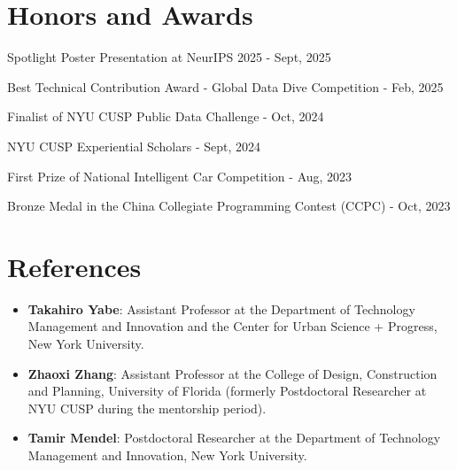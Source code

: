 \documentclass[a4paper,20pt]{article}
\newcommand{\github}[1]{
  \href{#1}{\faGithub}
}
\newcommand{\paper}[1]{
  \href{#1}{\faLink}
}
\newcommand{\resumeItem}[2]{
  \item\small{
    \textbf{#1}{: #2 \vspace{-2pt}}
  }
}
\newcommand{\resumeSubItem}[2]{\resumeItem{#1}{#2}\vspace{-3pt}}
\newcommand{\resumeSubHeadingListStart}{\begin{itemize}[leftmargin=0pt, label={}]}
\newcommand{\resumeSubHeadingListEnd}{\end{itemize}}
\begin{document}
\section{Honors and Awards}
\begin{description}[font=$\bullet$]
  \item{Spotlight Poster Presentation at NeurIPS 2025 - Sept, 2025 \paper{https://github.com/MazelTovy/AMRC}}
  \vspace{-5pt}
  \item{Best Technical Contribution Award - Global Data Dive Competition - Feb, 2025 \paper{https://docs.google.com/presentation/d/1Vf_OaO8iUelxuGhwhaDS-ypwzlFKihkM}}
  \vspace{-5pt}
  \item{Finalist of NYU CUSP Public Data Challenge - Oct, 2024 \paper{https://docs.google.com/presentation/d/1GGL3gzV5mJ0KLAir6hazS33j1yG3p9-z6fRmqLYKfB0}}
  \vspace{-5pt}
  \item{NYU CUSP Experiential Scholars - Sept, 2024}
  \vspace{-5pt}
  \item{First Prize of National Intelligent Car Competition - Aug, 2023 \github{https://github.com/MazelTovy/smart-car-18th}}
  \vspace{-5pt}
  \item{Bronze Medal in the China Collegiate Programming Contest (CCPC) - Oct, 2023}
\end{description}

\vspace{-3pt}
\section{References}
\resumeSubHeadingListStart
\resumeSubItem{Takahiro Yabe}{Assistant Professor at the Department of Technology Management and Innovation and the Center for Urban Science + Progress, New York University.}
\resumeSubItem{Zhaoxi Zhang}{Assistant Professor at the College of Design, Construction and Planning, University of Florida (formerly Postdoctoral Researcher at NYU CUSP during the mentorship period).}
\resumeSubItem{Tamir Mendel}{Postdoctoral Researcher at the Department of Technology Management and Innovation, New York University.}
\resumeSubHeadingListEnd
\end{document}
